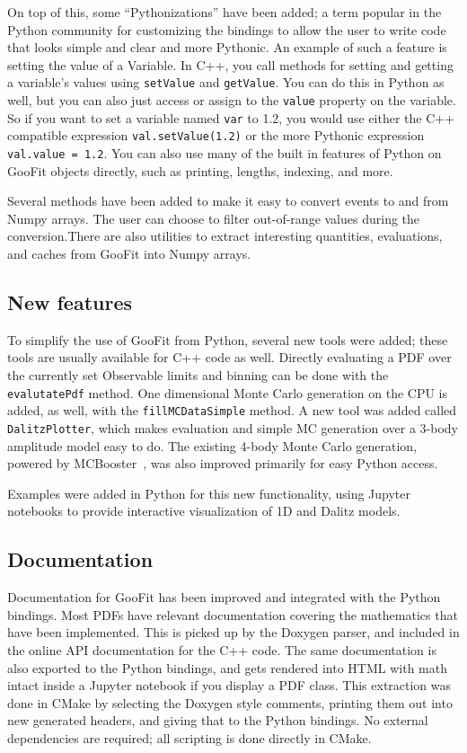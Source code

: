 \documentclass{webofc}
\begin{document}
On top of this, some ``Pythonizations'' have been added; a term popular in the Python community for customizing the bindings to allow the user to write code that looks simple and clear and more Pythonic. An example of such a feature is setting the value of a Variable. In C++, you call methods for setting and getting a variable's values using \texttt{setValue} and \texttt{getValue}. You can do this in Python as well, but you can also just access or assign to the \texttt{value} property on the variable. So if you want to set a variable named \lstinline|var| to 1.2, you would use either the C++ compatible expression \lstinline|val.setValue(1.2)| or the more Pythonic expression \lstinline|val.value = 1.2|. You can also use many of the built in features of Python on GooFit objects directly, such as printing, lengths, indexing, and more.

Several methods have been added to make it easy to convert events to and from Numpy arrays. The user can choose to filter out-of-range values during the conversion.There are also utilities to extract interesting quantities, evaluations, and caches from GooFit into Numpy arrays. 

\subsection{New features}

To simplify the use of GooFit from Python, several new tools were added; these tools are usually available for C++ code as well. Directly evaluating a PDF over the currently set Observable limits and binning can be done with the \texttt{evalutatePdf} method. One dimensional Monte Carlo generation on the CPU is added, as well, with the \texttt{fillMCDataSimple} method. A new tool was added called \texttt{DalitzPlotter}, which makes evaluation and simple MC generation over a 3-body amplitude model easy to do. The existing 4-body Monte Carlo generation, powered by MCBooster~\cite{lib:MCBooster}, was also improved primarily for easy Python access.

Examples were added in Python for this new functionality, using Jupyter notebooks to provide interactive visualization of 1D and Dalitz models.

\subsection{Documentation}

Documentation for GooFit has been improved and integrated with the Python bindings. Most PDFs have relevant documentation covering the mathematics that have been implemented. This is picked up by the Doxygen parser, and included in the online API documentation for the C++ code. The same documentation is also exported to the Python bindings, and gets rendered into HTML with math intact inside a Jupyter notebook if you display a PDF class. This extraction was done in CMake by selecting the Doxygen
style comments, printing them out into new generated headers, and giving that to the Python bindings. No external dependencies are required; all scripting is done directly in CMake.
\end{document}
